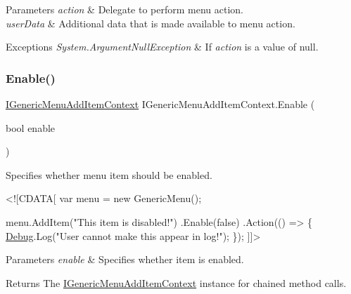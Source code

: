 \begin{DoxyParams}{Parameters}
{\em action} & Delegate to perform menu action.\\
\hline
{\em user\+Data} & Additional data that is made available to menu action.\\
\hline
\end{DoxyParams}

\begin{DoxyExceptions}{Exceptions}
{\em System.\+Argument\+Null\+Exception} & If {\itshape action}  is a value of {\ttfamily null}. \\
\hline
\end{DoxyExceptions}
\mbox{\label{interface_i_generic_menu_add_item_context_a682571e8c3fd7f58b8ae3c44fa4c1788}} 
\subsubsection{\texorpdfstring{Enable()}{Enable()}\hspace{0.1cm}{\footnotesize\ttfamily [1/2]}}
{\footnotesize\ttfamily \hyperlink{interface_i_generic_menu_add_item_context}{I\+Generic\+Menu\+Add\+Item\+Context} I\+Generic\+Menu\+Add\+Item\+Context.\+Enable (\begin{DoxyParamCaption}\item[{bool}]{enable }\end{DoxyParamCaption})}



Specifies whether menu item should be enabled. 


\begin{DoxyCode}
<![CDATA[
var menu = \textcolor{keyword}{new} GenericMenu();

menu.AddItem(\textcolor{stringliteral}{"This item is disabled!"})
    .Enable(\textcolor{keyword}{false})
    .Action(() => \{
        \hyperlink{namespace_debug}{Debug}.Log(\textcolor{stringliteral}{"User cannot make this appear in log!"});
    \});
]]>
\end{DoxyCode}
 


\begin{DoxyParams}{Parameters}
{\em enable} & Specifies whether item is enabled.\\
\hline
\end{DoxyParams}
\begin{DoxyReturn}{Returns}
The \hyperlink{interface_i_generic_menu_add_item_context}{I\+Generic\+Menu\+Add\+Item\+Context} instance for chained method calls. 
\end{DoxyReturn}
\mbox{\label{interface_i_generic_menu_add_item_context_ac97d8817141d805bb775570155634167}} 
